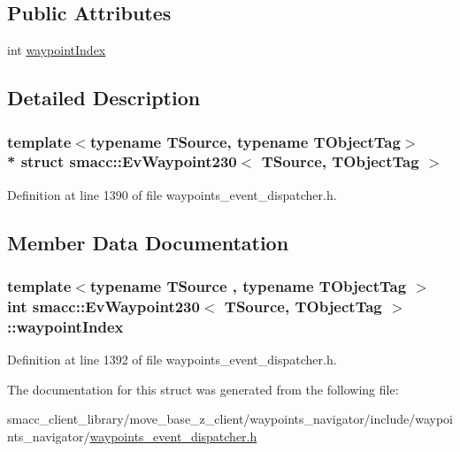 \subsection*{Public Attributes}
\begin{DoxyCompactItemize}
\item 
int \hyperlink{structsmacc_1_1EvWaypoint230_a3077cf9c1a221cc3ba1caf9292ac955d}{waypoint\+Index}
\end{DoxyCompactItemize}


\subsection{Detailed Description}
\subsubsection*{template$<$typename T\+Source, typename T\+Object\+Tag$>$\\*
struct smacc\+::\+Ev\+Waypoint230$<$ T\+Source, T\+Object\+Tag $>$}



Definition at line 1390 of file waypoints\+\_\+event\+\_\+dispatcher.\+h.



\subsection{Member Data Documentation}
\subsubsection[{\texorpdfstring{waypoint\+Index}{waypointIndex}}]{\setlength{\rightskip}{0pt plus 5cm}template$<$typename T\+Source , typename T\+Object\+Tag $>$ int {\bf smacc\+::\+Ev\+Waypoint230}$<$ T\+Source, T\+Object\+Tag $>$\+::waypoint\+Index}\hypertarget{structsmacc_1_1EvWaypoint230_a3077cf9c1a221cc3ba1caf9292ac955d}{}\label{structsmacc_1_1EvWaypoint230_a3077cf9c1a221cc3ba1caf9292ac955d}


Definition at line 1392 of file waypoints\+\_\+event\+\_\+dispatcher.\+h.



The documentation for this struct was generated from the following file\+:\begin{DoxyCompactItemize}
\item 
smacc\+\_\+client\+\_\+library/move\+\_\+base\+\_\+z\+\_\+client/waypoints\+\_\+navigator/include/waypoints\+\_\+navigator/\hyperlink{waypoints__event__dispatcher_8h}{waypoints\+\_\+event\+\_\+dispatcher.\+h}\end{DoxyCompactItemize}
